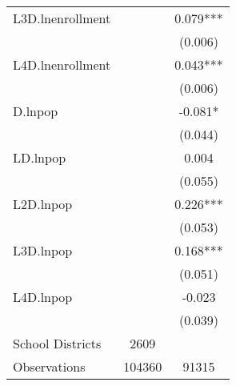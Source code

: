 \begin{tabular}{lcc}
L3D.lnenrollment    &  & 0.079*** \\
                    &  & (0.006) \\
L4D.lnenrollment    &  & 0.043*** \\
                    &  & (0.006) \\
D.lnpop             &  & -0.081* \\
                    &  & (0.044) \\
LD.lnpop            &  & 0.004 \\
                    &  & (0.055) \\
L2D.lnpop           &  & 0.226*** \\
                    &  & (0.053) \\
L3D.lnpop           &  & 0.168*** \\
                    &  & (0.051) \\
L4D.lnpop           &  & -0.023 \\
                    &  & (0.039) \\
\hline
School Districts    & 2609 & \\
Observations        & 104360 & 91315 \\
\hline
\end{tabular}
